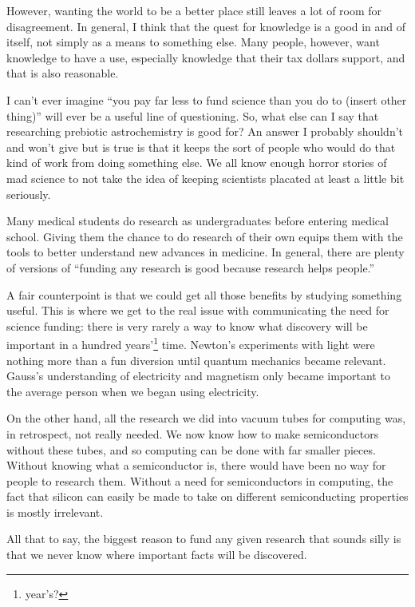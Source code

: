 \documentclass[12pt]{article}[titlepage]
\newcommand{\say}[1]{``#1''}
\renewcommand{\,}{\textsuperscript{,}}
\begin{document}
However, wanting the world to be a better place still leaves a lot of room for disagreement.  
In general, I think that the quest for knowledge is a good in and of itself, not simply as a means to something else.  
Many people, however, want knowledge to have a use, especially knowledge that their tax dollars support, and that is also reasonable.

I can't ever imagine \say{you pay far less to fund science than you do to (insert other thing)} will ever be a useful line of questioning.  
So, what else can I say that researching prebiotic astrochemistry is good for?  
An answer I probably shouldn't and won't give but is true is that it keeps the sort of people who would do that kind of work from doing something else.  
We all know enough horror stories of mad science to not take the idea of keeping scientists placated at least a little bit seriously.

Many medical students do research as undergraduates before entering medical school.  
Giving them the chance to do research of their own equips them with the tools to better understand new advances in medicine.  
In general, there are plenty of versions of \say{funding any research is good because research helps people.}

A fair counterpoint is that we could get all those benefits by studying something useful.  
This is where we get to the real issue with communicating the need for science funding: there is very rarely a way to know what discovery will be important in a hundred years'\footnote{year's?} time.  
Newton's experiments with light were nothing more than a fun diversion until quantum mechanics became relevant.  
Gauss's understanding of electricity and magnetism only became important to the average person when we began using electricity.

On the other hand, all the research we did into vacuum tubes for computing was, in retrospect, not really needed.  
We now know how to make semiconductors without these tubes, and so computing can be done with far smaller pieces.  
Without knowing what a semiconductor is, there would have been no way for people to research them.  
Without a need for semiconductors in computing, the fact that silicon can easily be made to take on different semiconducting properties is mostly irrelevant.

All that to say, the biggest reason to fund any given research that sounds silly is that we never know where important facts will be discovered.
\end{document}
